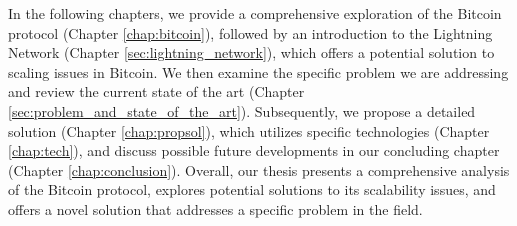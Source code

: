In the following chapters, we provide a comprehensive exploration of the Bitcoin protocol
(Chapter \ref{chap:bitcoin}), followed by an introduction to the Lightning Network
(Chapter \ref{sec:lightning_network}), which offers a potential solution to scaling issues
in Bitcoin. We then examine the specific problem we are addressing and review the current
state of the art (Chapter \ref{sec:problem_and_state_of_the_art}). Subsequently, we propose
a detailed solution (Chapter \ref{chap:propsol}), which utilizes specific technologies
(Chapter \ref{chap:tech}), and discuss possible future developments in our concluding chapter
(Chapter \ref{chap:conclusion}). Overall, our thesis presents a comprehensive analysis of the
Bitcoin protocol, explores potential solutions to its scalability issues, and offers a novel
solution that addresses a specific problem in the field.

